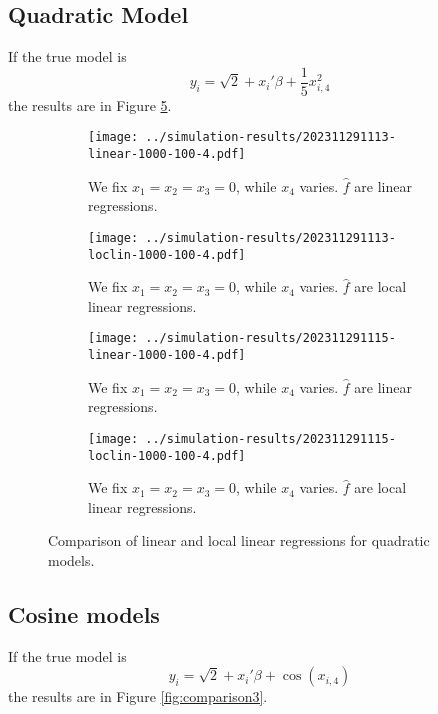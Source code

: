 \documentclass[12pt]{article}
\begin{document}
\subsection{Quadratic Model}

If the true model is 
\begin{equation*}
    y_{i} = \sqrt{2} + x_{i}'\beta + \frac{1}{5} x_{i,4}^{2}
\end{equation*}
the results are in Figure \ref{fig:comparison2}.



\begin{figure}[h]
    \centering
    \begin{subfigure}[b]{0.45\textwidth}
        \texttt{[image: ../simulation-results/202311291113-linear-1000-100-4.pdf]}
        \caption{We fix \(x_{1} = x_{2} = x_{3} = 0\), while \(x_{4}\) varies. \(\hat{f}\) are linear regressions.}
        \label{fig:5}
    \end{subfigure}
    \hfill
    \begin{subfigure}[b]{0.45\textwidth}
        \texttt{[image: ../simulation-results/202311291113-loclin-1000-100-4.pdf]}
        \caption{We fix \(x_{1} = x_{2} = x_{3} = 0\), while \(x_{4}\) varies. \(\hat{f}\) are local linear regressions.}
        \label{fig:6}
    \end{subfigure}
    \vfill
    \begin{subfigure}[b]{0.45\textwidth}
        \texttt{[image: ../simulation-results/202311291115-linear-1000-100-4.pdf]}
        \caption{We fix \(x_{1} = x_{2} = x_{3} = 0\), while \(x_{4}\) varies. \(\hat{f}\) are linear regressions.}
        \label{fig:7}
    \end{subfigure}
    \hfill
    \begin{subfigure}[b]{0.45\textwidth}
        \texttt{[image: ../simulation-results/202311291115-loclin-1000-100-4.pdf]}
        \caption{We fix \(x_{1} = x_{2} = x_{3} = 0\), while \(x_{4}\) varies. \(\hat{f}\) are local linear regressions.}
        \label{fig:8}
    \end{subfigure}
    \caption{Comparison of linear and local linear regressions for quadratic models.}
    \label{fig:comparison2}
\end{figure}
\newpage 


\subsection{Cosine models}
If the true model is 
\begin{equation*}
    y_{i} = \sqrt{2} + x_{i}'\beta + \cos(x_{i,4})
\end{equation*}
the results are in Figure \ref{fig:comparison3}.
\end{document}

